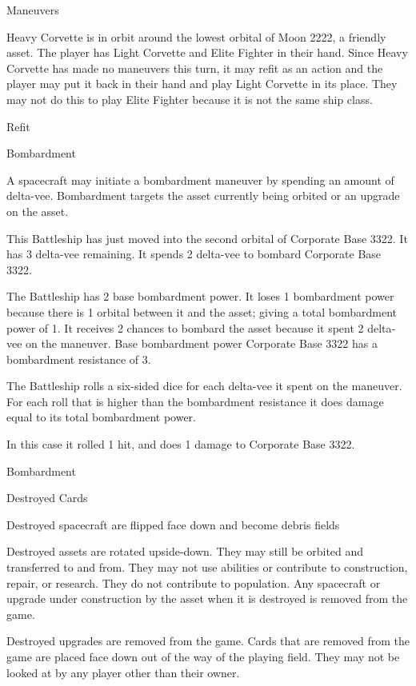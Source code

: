 \documentclass[twoside]{minimal}
\newenvironment{section}[1]
{\renewcommand{\title}{\begin{center} \fontsize{24.88}{32}\selectfont #1 \end{center}} \ignorespaces}
{\clearpage \ignorespacesafterend}
\newenvironment{supersection}[1]
{
\renewcommand{\title}{\begin{center} \fontsize{24.88}{32}\selectfont #1 \end{center}}
\renewenvironment{section}[1]
 {\title \renewcommand{\title}{\begin{flushleft} \fontsize{20.74}{28}\selectfont ##1 \end{flushleft}} \ignorespaces}
 {\clearpage \ignorespacesafterend}
\ignorespaces
}
{\clearpage \ignorespacesafterend}
\begin{document}
\begin{supersection}{Maneuvers}
\begin{section}{Refit}
        Heavy Corvette is in orbit around the lowest orbital of Moon 2222, a friendly asset.
        The player has Light Corvette and Elite Fighter in their hand.
        Since Heavy Corvette has made no maneuvers this turn, it may refit as an action and the player may put it back in their hand and play Light Corvette in its place.
        They may not do this to play Elite Fighter because it is not the same ship class.
    \end{section}

    \begin{section}{Bombardment}
        \title

        A spacecraft may initiate a bombardment maneuver by spending an amount of delta-vee.
        Bombardment targets the asset currently being orbited or an upgrade on the asset.

        This Battleship has just moved into the second orbital of Corporate Base 3322.
        It has 3 delta-vee remaining.
        It spends 2 delta-vee to bombard Corporate Base 3322.

        The Battleship has 2 base bombardment power.
        It loses 1 bombardment power because there is 1 orbital between it and the asset; giving a total bombardment power of 1.
        It receives 2 chances to bombard the asset because it spent 2 delta- vee on the maneuver.
        Base bombardment power Corporate Base 3322 has a bombardment resistance of 3.

        The Battleship rolls a six-sided dice for each delta-vee it spent on the maneuver.
        For each roll that is higher than the bombardment resistance it does damage equal to its total bombardment power.

        In this case it rolled 1 hit, and does 1 damage to Corporate Base 3322.
    \end{section}
\end{supersection}

\begin{section}{Destroyed Cards}
\title

Destroyed spacecraft are flipped face down and become debris fields

Destroyed assets are rotated upside-down.
They may still be orbited and transferred to and from.
They may not use abilities or contribute to construction, repair, or research.
They do not contribute to population.
Any spacecraft or upgrade under construction by the asset when it is destroyed is removed from the game.

Destroyed upgrades are removed from the game.
Cards that are removed from the game are placed face down out of the way of the playing field.
They may not be looked at by any player other than their owner.
\end{section}
\end{document}
